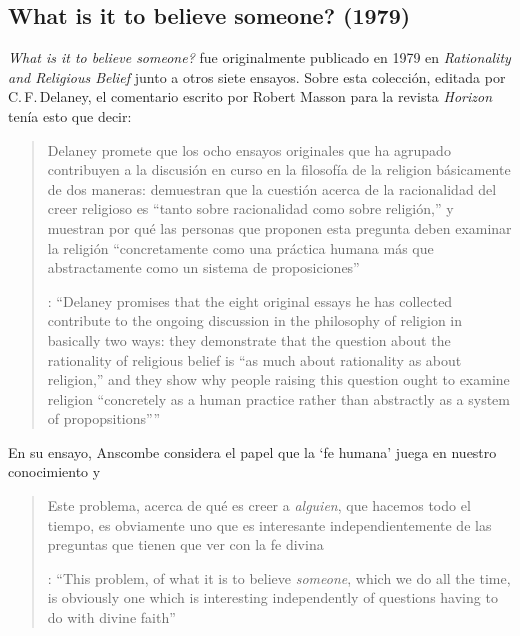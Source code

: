 \subsection{What is it to believe someone? (1979)}

\emph{What is it to believe someone?} fue originalmente publicado en 1979 en \emph{Rationality and Religious Belief} junto a otros siete ensayos. Sobre esta colección, editada por C.\,F.\,Delaney, el comentario escrito por Robert Masson para la revista \emph{Horizon} tenía esto que decir: \blockquote[{\cite[440]{masson1981}}: \enquote{Delaney promises that the eight original essays he has collected \textelp{} contribute to the ongoing discussion in the philosophy of religion in basically two ways: they demonstrate that the question about the rationality of religious belief is ``as much about rationality as about religion,'' and they show why people raising this question ought to examine religion ``concretely as a human practice rather than abstractly as a system of propopsitions''}]{Delaney promete que los ocho ensayos originales que ha agrupado \textelp{} contribuyen a la discusión en curso en la filosofía de la religion básicamente de dos maneras: demuestran que la cuestión acerca de la racionalidad del creer religioso es ``tanto sobre racionalidad como sobre religión,'' y muestran por qué las personas que proponen esta pregunta deben examinar la religión ``concretamente como una práctica humana más que abstractamente como un sistema de proposiciones''}. En su ensayo, Anscombe considera el papel que la `fe humana' juega en nuestro conocimiento y \blockquote[{\cite[xvii]{anscombe2008faith}}: \enquote{This problem, of what it is to believe \emph{someone}, which we do all the time, is obviously one which is interesting independently of questions having to do with divine faith}]{Este problema, acerca de qué es creer a \emph{alguien}, que hacemos todo el tiempo, es obviamente uno que es interesante independientemente de las preguntas que tienen que ver con la fe divina}.

